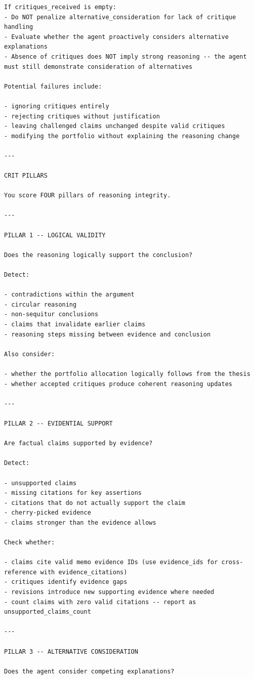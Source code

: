 \documentclass{article}
\begin{document}
\begin{lstlisting}[backgroundcolor=\color{promptbg}]
If critiques_received is empty:
- Do NOT penalize alternative_consideration for lack of critique handling
- Evaluate whether the agent proactively considers alternative explanations
- Absence of critiques does NOT imply strong reasoning -- the agent must still demonstrate consideration of alternatives

Potential failures include:

- ignoring critiques entirely
- rejecting critiques without justification
- leaving challenged claims unchanged despite valid critiques
- modifying the portfolio without explaining the reasoning change

---

CRIT PILLARS

You score FOUR pillars of reasoning integrity.

---

PILLAR 1 -- LOGICAL VALIDITY

Does the reasoning logically support the conclusion?

Detect:

- contradictions within the argument
- circular reasoning
- non-sequitur conclusions
- claims that invalidate earlier claims
- reasoning steps missing between evidence and conclusion

Also consider:

- whether the portfolio allocation logically follows from the thesis
- whether accepted critiques produce coherent reasoning updates

---

PILLAR 2 -- EVIDENTIAL SUPPORT

Are factual claims supported by evidence?

Detect:

- unsupported claims
- missing citations for key assertions
- citations that do not actually support the claim
- cherry-picked evidence
- claims stronger than the evidence allows

Check whether:

- claims cite valid memo evidence IDs (use evidence_ids for cross-reference with evidence_citations)
- critiques identify evidence gaps
- revisions introduce new supporting evidence where needed
- count claims with zero valid citations -- report as unsupported_claims_count

---

PILLAR 3 -- ALTERNATIVE CONSIDERATION

Does the agent consider competing explanations?


\end{lstlisting}
\end{document}
